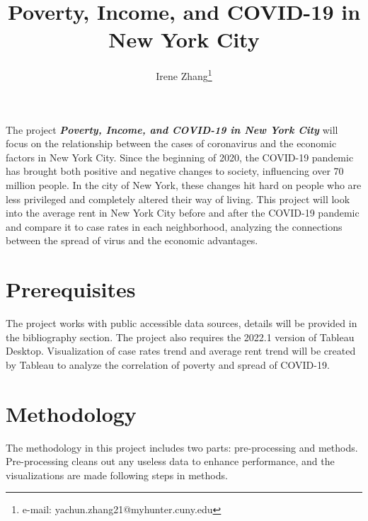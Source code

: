 \documentclass{vgtc}                 %
\title{Poverty, Income, and COVID-19 in New York City}
\author{Irene Zhang\thanks{e-mail: yachun.zhang21@myhunter.cuny.edu}}
\begin{document}


\maketitle

The project \emph{\textbf{Poverty, Income, and COVID-19 in New York City}} will focus on the relationship between the cases of coronavirus and the economic factors in New York City. Since the beginning of 2020, the COVID-19 pandemic has brought both positive and negative changes to society, influencing over 70 million people. In the city of New York, these changes hit hard on people who are less privileged and completely altered their way of living. This project will look into the average rent in New York City before and after the COVID-19 pandemic and compare it to case rates in each neighborhood, analyzing the connections between the spread of virus and the economic advantages. 
\section{Prerequisites}

The project works with public accessible data sources, details will be provided in the bibliography section. The project also requires the 2022.1 version of Tableau Desktop. Visualization of case rates trend and average rent trend will be created by Tableau to analyze the correlation of poverty and spread of COVID-19.

\section{Methodology}

The methodology in this project includes two parts: pre-processing and methods. Pre-processing cleans out any useless data to enhance performance, and the visualizations are made following steps in methods.
\end{document}
